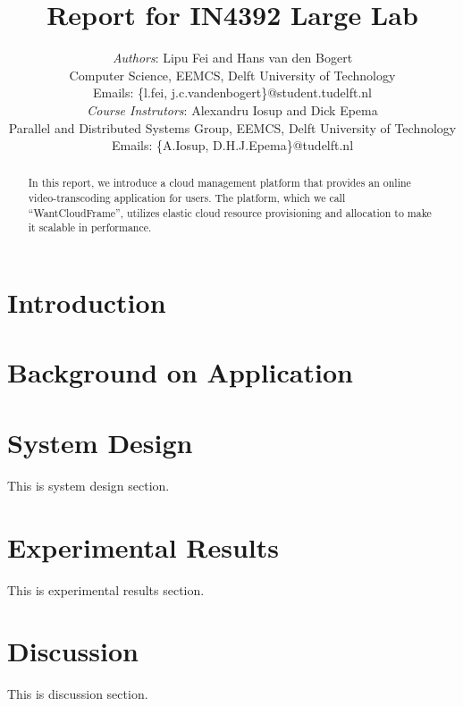 \documentclass[10pt, a4paper, twoside, twocolumn, technote]{IEEEtran}
\begin{document}
\title{Report for IN4392 Large Lab}
\author{\textit{Authors}: Lipu Fei and Hans van den Bogert\\
  Computer Science, EEMCS, Delft University of Technology\\
  Emails: \{l.fei, j.c.vandenbogert\}@student.tudelft.nl\\
  \textit{Course Instrutors}: Alexandru Iosup and Dick Epema\\
  Parallel and Distributed Systems Group, EEMCS, Delft University of Technology\\
  Emails: \{A.Iosup, D.H.J.Epema\}@tudelft.nl}


\maketitle


\begin{abstract}
  In this report, we introduce a cloud management platform that
  provides an online video-transcoding application for users. The
  platform, which we call ``WantCloudFrame'', utilizes elastic cloud
  resource provisioning and allocation to make it scalable in
  performance.
\end{abstract}

\section{Introduction}


\section{Background on Application}\label{background}


\section{System Design}\label{design}
This is system design section.

\section{Experimental Results}\label{experiment}
This is experimental results section.

\section{Discussion}\label{discussion}
This is discussion section.
\end{document}
